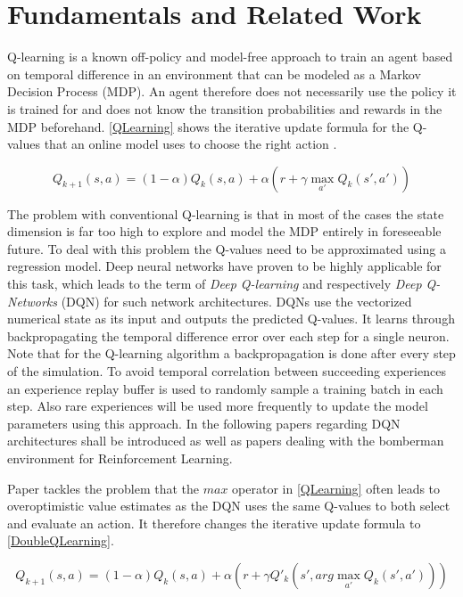 \section{Fundamentals and Related Work} \label{fundamentals_related_work}

Q-learning is a known off-policy and model-free approach to train an agent based on temporal difference in an environment that can be modeled as a Markov Decision Process (MDP). An agent therefore does not necessarily use the policy it is trained for and does not know the transition probabilities and rewards in the MDP beforehand. \autoref{QLearning} shows the iterative update formula for the Q-values that an online model uses to choose the right action \cite{Geron2018}.

\begin{equation} \label{QLearning}
	Q_{k+1}(s,a) = (1-\alpha) Q_k(s,a) + \alpha(r + \gamma \max_{a'} Q_k(s',a')) 
\end{equation}

The problem with conventional Q-learning is that in most of the cases the state dimension is far too high to explore and model the MDP entirely in foreseeable future. To deal with this problem the Q-values need to be approximated using a regression model. Deep neural networks have proven to be highly applicable for this task, which leads to the term of \textit{Deep Q-learning} and respectively \textit{Deep Q-Networks} (DQN) for such network architectures. DQNs use the vectorized numerical state as its input and outputs the predicted Q-values. It learns through backpropagating the temporal difference error over each step for a single neuron. Note that for the Q-learning algorithm a backpropagation is done after every step of the simulation. To avoid temporal correlation between succeeding experiences an experience replay buffer is used to randomly sample a training batch in each step. Also rare experiences will be used more frequently to update the model parameters using this approach. In the following papers regarding DQN architectures shall be introduced as well as papers dealing with the bomberman environment for Reinforcement Learning. 

Paper \cite{vanHasselt2015} tackles the problem that the $max$ operator in \autoref{QLearning} often leads to overoptimistic value estimates as the DQN uses the same Q-values to both select and evaluate an action. It therefore changes the iterative update formula to \ref{DoubleQLearning}.

\begin{equation} \label{DoubleQLearning}
	Q_{k+1}(s,a) = (1-\alpha) Q_k(s,a) + \alpha(r + \gamma Q'_k(s', arg\max_{a'} Q_k(s',a'))) 
\end{equation}


